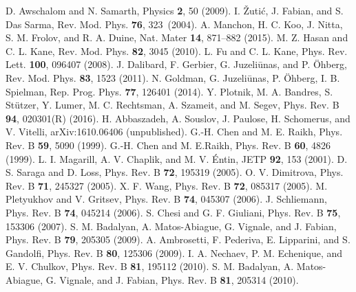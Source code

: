 \documentclass[aps, pra, reprint,superscriptaddress]{revtex4-1}
\begin{document}
\begin{thebibliography}{90}
D. Awschalom and N. Samarth, Physics \textbf{2}, 50 (2009).
%
I. \v Zuti\' c, J. Fabian, and S. Das Sarma, Rev. Mod. Phys. \textbf{76}, 323~(2004).
%
A. Manchon, H. C. Koo, J. Nitta, S. M. Frolov, and R. A. Duine, Nat. Mater \textbf{14}, 871–882 (2015).
%
M. Z. Hasan and C. L. Kane, Rev. Mod. Phys. \textbf{82}, 3045 (2010).
%
L. Fu and C. L. Kane, Phys. Rev. Lett. \textbf{100}, 096407 (2008). 
%
 J. Dalibard, F. Gerbier, G. Juzeli\={u}nas, and P. \"{O}hberg, Rev. Mod. Phys. \textbf{83}, 1523 (2011).
%
 N. Goldman, G. Juzeli\={u}nas, P. \"{O}hberg, I. B. Spielman, Rep. Prog. Phys. \textbf{77}, 126401 (2014).
%
  Y. Plotnik, M. A. Bandres, S. St{\"u}tzer, Y. Lumer, M. C. Rechtsman, A. Szameit, and M. Segev, Phys. Rev. B \textbf{94}, 020301(R) (2016).
%
  H. Abbaszadeh, A. Souslov, J. Paulose, H. Schomerus, and V. Vitelli, arXiv:1610.06406 (unpublished).
%
 G.-H. Chen and M. E. Raikh, Phys. Rev. B \textbf{59}, 5090 (1999).
%
 G.-H. Chen and M. E.Raikh, Phys. Rev. B \textbf{60}, 4826 (1999).
%
 L. I. Magarill, A. V. Chaplik, and M. V. \'Entin, JETP \textbf{92}, 153 (2001).
%
 D. S. Saraga and D. Loss, Phys. Rev. B \textbf{72}, 195319 (2005).
%
  O. V. Dimitrova, Phys. Rev. B \textbf{71}, 245327 (2005).
%
 X. F. Wang, Phys. Rev. B \textbf{72}, 085317 (2005). 
 M. Pletyukhov and V. Gritsev, Phys. Rev. B \textbf{74}, 045307 (2006). 
%
 J. Schliemann, Phys. Rev. B \textbf{74}, 045214 (2006). 
%
 S. Chesi and G. F. Giuliani, Phys. Rev. B \textbf{75}, 153306 (2007).
%
 S. M. Badalyan, A. Matos-Abiague, G. Vignale, and J. Fabian, Phys. Rev. B \textbf{79}, 205305 (2009).
%
 A. Ambrosetti, F. Pederiva, E. Lipparini, and S. Gandolfi, Phys. Rev. B \textbf{80}, 125306 (2009).
%
 I. A. Nechaev, P. M. Echenique, and E. V. Chulkov, Phys. Rev. B \textbf{81}, 195112 (2010).
%
 S. M. Badalyan, A. Matos-Abiague, G. Vignale, and J. Fabian, Phys. Rev. B \textbf{81}, 205314 (2010).

\end{thebibliography}
\end{document}
